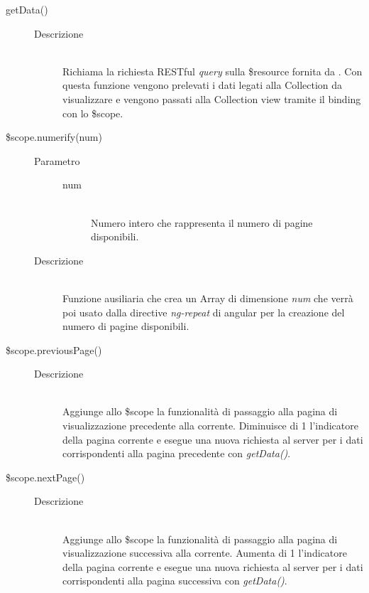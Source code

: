 \begin{description}
\begin{description}
  \item[getData()] \hfill
    \begin{description}
  	\item[Descrizione] \hfill \\
  Richiama la richiesta RESTful \textit{query} sulla \$resource fornita da .
  Con questa funzione vengono prelevati i dati legati alla Collection da visualizzare e vengono
  passati alla Collection view tramite il binding con lo \$scope. \\
  
      \end{description}

  \item[\$scope.numerify(num)] \hfill
  \begin{description}
  	\item[Parametro] \hfill
  		\begin{description}
  			\item[num] \hfill \\
  			Numero intero che rappresenta il numero di pagine disponibili.
       \end{description}
  	\item[Descrizione] \hfill \\
     Funzione ausiliaria che crea un Array di dimensione \textit{num} che verrà poi usato dalla directive   \textit{ng-repeat} di angular per la creazione del numero di pagine disponibili.
    \end{description}
  
  
  \item[\$scope.previousPage()] \hfill
    \begin{description}
  	\item[Descrizione] \hfill \\
  Aggiunge allo \$scope la funzionalità di passaggio alla pagina di visualizzazione precedente alla corrente.
  Diminuisce di 1 l'indicatore della pagina corrente e esegue una nuova richiesta al server per i dati corrispondenti alla pagina precedente con \textit{getData()}.
      \end{description}

  \item[\$scope.nextPage()] \hfill
    \begin{description}
  	\item[Descrizione] \hfill \\
  Aggiunge allo \$scope la funzionalità di passaggio alla pagina di visualizzazione successiva alla corrente.
  Aumenta di 1 l'indicatore della pagina corrente e esegue una nuova richiesta al server per i dati corrispondenti alla pagina successiva con \textit{getData()}.
      \end{description}


\end{description}
\end{description}
